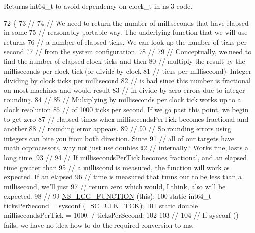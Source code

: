 Returns {\ttfamily int64\+\_\+t} to avoid dependency on {\ttfamily clock\+\_\+t} in ns-\/3 code. 
\begin{DoxyCode}
72 \{
73   \textcolor{comment}{//}
74   \textcolor{comment}{// We need to return the number of milliseconds that have elapsed in some}
75   \textcolor{comment}{// reasonably portable way.  The underlying function that we will use returns}
76   \textcolor{comment}{// a number of elapsed ticks.  We can look up the number of ticks per second}
77   \textcolor{comment}{// from the system configuration.}
78   \textcolor{comment}{//}
79   \textcolor{comment}{// Conceptually, we need to find the number of elapsed clock ticks and then}
80   \textcolor{comment}{// multiply the result by the milliseconds per clock tick (or divide by clock}
81   \textcolor{comment}{// ticks per millisecond).  Integer dividing by clock ticks per millisecond}
82   \textcolor{comment}{// is bad since this number is fractional on most machines and would result}
83   \textcolor{comment}{// in divide by zero errors due to integer rounding.}
84   \textcolor{comment}{//}
85   \textcolor{comment}{// Multiplying by milliseconds per clock tick works up to a clock resolution }
86   \textcolor{comment}{// of 1000 ticks per second.  If we go  past this point, we begin to get zero}
87   \textcolor{comment}{// elapsed times when millisecondsPerTick becomes fractional and another }
88   \textcolor{comment}{// rounding error appears.}
89   \textcolor{comment}{//}
90   \textcolor{comment}{// So rounding errors using integers can bite you from both direction.  Since }
91   \textcolor{comment}{// all of our targets have math coprocessors, why not just use doubles }
92   \textcolor{comment}{// internally?  Works fine, lasts a long time.}
93   \textcolor{comment}{//}
94   \textcolor{comment}{// If millisecondsPerTick becomes fractional, and an elapsed time greater than }
95   \textcolor{comment}{// a milliscond is measured, the function will work as expected.  If an elapsed }
96   \textcolor{comment}{// time is measured that turns out to be less than a millisecond, we'll just }
97   \textcolor{comment}{// return zero which would, I think, also will be expected.}
98   \textcolor{comment}{//}
99   \hyperlink{log-macros-disabled_8h_a90b90d5bad1f39cb1b64923ea94c0761}{NS\_LOG\_FUNCTION} (\textcolor{keyword}{this});
100   \textcolor{keyword}{static} int64\_t ticksPerSecond = sysconf (\_SC\_CLK\_TCK);
101   \textcolor{keyword}{static} \textcolor{keywordtype}{double} millisecondsPerTick = 1000. / ticksPerSecond;
102 
103   \textcolor{comment}{//}
104   \textcolor{comment}{// If sysconf () fails, we have no idea how to do the required conversion to ms.}

\end{DoxyCode}
